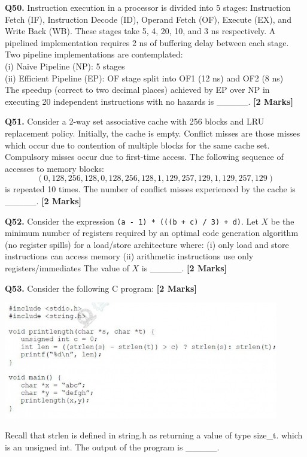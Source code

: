 \documentclass[11pt]{article}
\newcommand{\questionb}[2]{
    \noindent\textbf{Q#2.} #1 \hfill \textbf{[2 Marks]}
}
\begin{document}
\questionb{Instruction execution in a processor is divided into 5 stages: Instruction Fetch (IF), Instruction Decode (ID),  
Operand Fetch (OF), Execute (EX), and Write Back (WB). These stages take 5, 4, 20, 10, and 3 ns respectively.  
A pipelined implementation requires 2 ns of buffering delay between each stage.  
Two pipeline implementations are contemplated:\\  
(i) Naive Pipeline (NP): 5 stages \\ 
(ii) Efficient Pipeline (EP): OF stage split into OF1 (12 ns) and OF2 (8 ns)  \\
The speedup (correct to two decimal places) achieved by EP over NP in executing 20 independent instructions with no hazards is \_\_\_\_\_.}{50}
\vspace{0.5cm}

\questionb{Consider a 2-way set associative cache with 256 blocks and LRU replacement policy. Initially, the cache is empty.  
Conflict misses are those misses which occur due to contention of multiple blocks for the same cache set.  
Compulsory misses occur due to first-time access.  
The following sequence of accesses to memory blocks:  
\[
(0,128,256,128,0,128,256,128,1,129,257,129,1,129,257,129)
\]  
is repeated 10 times. The number of conflict misses experienced by the cache is \_\_\_\_\_.}{51}
\vspace{0.5cm}

\questionb{Consider the expression \texttt{(a - 1) * (((b + c) / 3) + d)}.  
Let \( X \) be the minimum number of registers required by an optimal code generation algorithm (no register spills)  
for a load/store architecture where:  
(i) only load and store instructions can access memory  
(ii) arithmetic instructions use only registers/immediates  
The value of \( X \) is \_\_\_\_\_.}{52}
\vspace{0.5cm}

\questionb{Consider the following C program:}{53}
\begin{center}
\includegraphics[width=0.9\textwidth]{figures/53.png}
\end{center}
Recall that strlen is defined in string.h as returning a value of type size\_t. which is an
unsigned int. 
 The output of the program is \_\_\_\_\_.  
\vspace{0.5cm}
\end{document}
